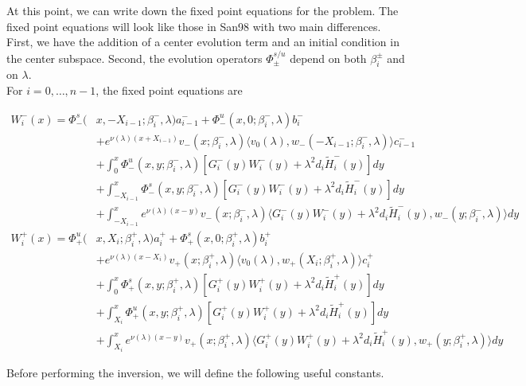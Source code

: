 \documentclass[12pt]{article}
\begin{document}
At this point, we can write down the fixed point equations for the problem. The fixed point equations will look like those in San98 with two main differences. First, we have the addition of a center evolution term and an initial condition in the center subspace. Second, the evolution operators $\Phi^{s/u}_\pm$ depend on both $\beta_i^\pm$ and on $\lambda$.\\

For $i = 0, \dots, n-1$, the fixed point equations are

\begin{align*}
W_i^-(x) = \Phi^s_-(&x, -X_{i-1}; \beta_i^-, \lambda) a_{i-1}^- + \Phi^u_-(x, 0; \beta_i^-, \lambda) b_i^- \\
&+ e^{\nu(\lambda)(x+X_{i-1})} v_-(x; \beta_i^-, \lambda) \langle v_0(\lambda), w_-(-X_{i-1}; \beta_i^-, \lambda) \rangle c_{i-1}^- \\
&+ \int_0^x \Phi^u_-(x, y; \beta_i^-, \lambda)[ G_i^-(y)W_i^-(y) + \lambda^2 d_i \tilde{H}_i^-(y) ] dy \\
&+ \int_{-X_{i-1}}^x \Phi^s_-(x, y; \beta_i^-, \lambda) [ G_i^-(y)W_i^-(y) + \lambda^2 d_i \tilde{H}_i^-(y) ] dy \\
&+ \int_{-X_{i-1}}^x 
e^{\nu(\lambda)(x-y)} v_-(x; \beta_i^-, \lambda) \langle G_i^-(y)W_i^-(y) + \lambda^2 d_i \tilde{H}_i^-(y), w_-(y; \beta_i^-, \lambda) \rangle dy \\
W_i^+(x) = \Phi^u_+(&x, X_i; \beta_i^+, \lambda)a_i^+ + \Phi^s_+(x, 0; \beta_i^+, \lambda)b_i^+ \\
&+ e^{\nu(\lambda)(x - X_i)} v_+(x; \beta_i^+, \lambda) \langle v_0(\lambda), w_+(X_i; \beta_i^+, \lambda) \rangle c_i^+ \\
&+ \int_0^x \Phi^s_+(x, y; \beta_i^+, \lambda) [ G_i^+(y)W_i^+(y) + \lambda^2 d_i \tilde{H}_i^+(y) ] dy \\
&+ \int_{X_i}^x \Phi^u_+(x, y; \beta_i^+, \lambda) [ G_i^+(y)W_i^+(y) + \lambda^2 d_i \tilde{H}_i^+(y) ] dy \\
&+ \int_{X_i}^x e^{\nu(\lambda)(x-y)} v_+(x; \beta_i^+, \lambda) \langle G_i^+(y)W_i^+(y) + \lambda^2 d_i \tilde{H}_i^+(y), w_+(y; \beta_i^+, \lambda) \rangle dy
\end{align*}

Before performing the inversion, we will define the following useful constants.
\end{document}
